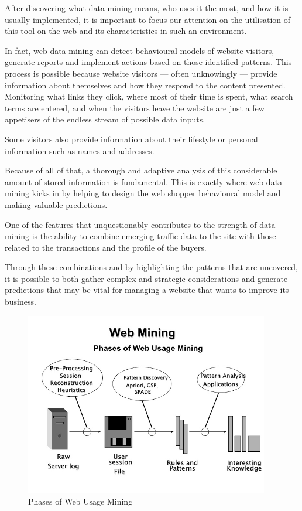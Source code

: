 After discovering what data mining means, who uses it the most, and how it is usually implemented, it is important to focus our attention on the utilisation of this tool on the web and its characteristics in such an environment.

In fact, web data mining can detect behavioural models of website visitors, generate reports and implement actions based on those identified patterns.
This process is possible because website visitors --- often unknowingly --- provide information about themselves and how they respond to the content presented. Monitoring what links they click, where most of their time is spent, what search terms are entered, and when the visitors leave the website are just a few appetisers of the endless stream of possible data inputs.

Some visitors also provide information about their lifestyle or personal information such as names and addresses.

Because of all of that, a thorough and adaptive analysis of this considerable amount of stored information is fundamental. This is exactly where web data mining kicks in by helping to design the web shopper behavioural model and making valuable predictions.

One of the features that unquestionably contributes to the strength of data mining is the ability to combine emerging traffic data to the site with those related to the transactions and the profile of the buyers.

Through these combinations and by highlighting the patterns that are uncovered, it is possible to both gather complex and strategic considerations and generate predictions that may be vital for managing a website that wants to improve its business.

\vspace{0.5cm}
\begin{figure}[!htbp]
  \centering
    \includegraphics[height=8cm]{images/webmining}
  \caption{Phases of Web Usage Mining}
  \label{fig:webmining}
\end{figure}
\vspace{0.5cm}

